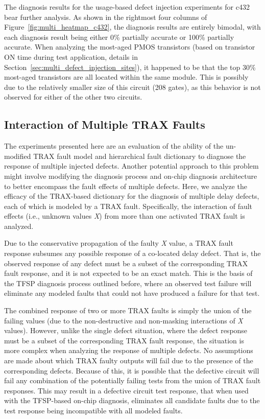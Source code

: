 The diagnosis results for the usage-based defect injection experiments for c432 bear further analysis.
%
As shown in the rightmost four columns of Figure~\ref{fig:multi_heatmap_c432}, the diagnosis results are entirely bimodal, with each diagnosis result being either 0\% partially accurate or 100\% partially accurate.
%
When analyzing the most-aged PMOS transistors (based on transistor ON time during test application, details in Section~\ref{sec:multi_defect_injection_sites}), it happened to be that the top 30\% most-aged transistors are all located within the same module.
%
This is possibly due to the relatively smaller size of this circuit (208 gates), as this behavior is not observed for either of the other two circuits.


\subsection{Interaction of Multiple TRAX Faults}
The experiments presented here are an evaluation of the ability of the un-modified TRAX fault model and hierarchical fault dictionary to diagnose the response of multiple injected defects.
%
Another potential approach to this problem might involve modifying the diagnosis process and on-chip diagnosis architecture to better encompass the fault effects of multiple defects.
%
Here, we analyze the efficacy of the TRAX-based dictionary for the diagnosis of multiple delay defects, each of which is modeled by a TRAX fault.
%
Specifically, the interaction of fault effects (i.e., unknown values \textit{X}) from more than one activated TRAX fault is analyzed.

Due to the conservative propagation of the faulty \textit{X} value, a TRAX fault response subsumes any possible response of a co-located delay defect.
%
That is, the observed response of any defect must be a subset of the corresponding TRAX fault response, and it is not expected to be an exact match.
%
This is the basis of the TFSP diagnosis process outlined before, where an observed test failure will eliminate any modeled faults that could not have produced a failure for that test.

The combined response of two or more TRAX faults is simply the union of the failing values (due to the non-destructive and non-masking interactions of \textit{X} values).
%
However, unlike the single defect situation, where the defect response must be a subset of the corresponding TRAX fault response, the situation is more complex when analyzing the response of multiple defects.
%
No assumptions are made about which TRAX faulty outputs will fail due to the presence of the corresponding defects.
%
Because of this, it is possible that the defective circuit will fail any combination of the potentially failing tests from the union of TRAX fault responses.
%
This may result in a defective circuit test response, that when used with the TFSP-based on-chip diagnosis, eliminates all candidate faults due to the test response being incompatible with all modeled faults.

